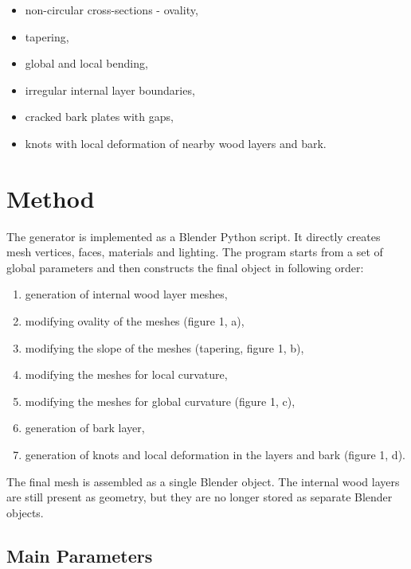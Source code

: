 \documentclass{egpubl}
\begin{document}
\begin{itemize}
    \item non-circular cross-sections - ovality,
    \item tapering,
    \item global and local bending,
    \item irregular internal layer boundaries,
    \item cracked bark plates with gaps,
    \item knots with local deformation of nearby wood layers and bark.
\end{itemize}


\section{Method}

The generator is implemented as a Blender Python script. It directly creates mesh vertices, faces, materials and lighting. The program starts from a set of global parameters and then constructs the final object in following order:

\begin{enumerate}
    \item generation of internal wood layer meshes,
    \item modifying ovality of the meshes (figure 1, a),
    \item modifying the slope of the meshes (tapering, figure 1, b),
    \item modifying the meshes for local curvature,
    \item modifying the meshes for global curvature (figure 1, c),
    \item generation of bark layer,
    \item generation of knots and local deformation in the layers and bark (figure 1, d).
\end{enumerate}

The final mesh is assembled as a single Blender object. The internal wood layers are still present as geometry, but they are no longer stored as separate Blender objects.


\subsection{Main Parameters}
\end{document}

